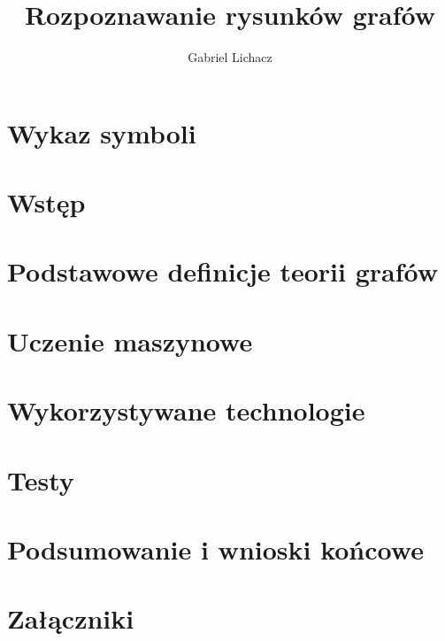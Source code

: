 \documentclass[12pt,twoside]{article}
\author{Gabriel Lichacz}
\title{Rozpoznawanie rysunków grafów}
\begin{document}
\maketitle

\blankpage

\tableofcontents

\clearpage
\blankpage

\section*{Wykaz symboli}

\clearpage

\section{Wstęp}


\section{Podstawowe definicje teorii grafów}


\section{Uczenie maszynowe}


\section{Wykorzystywane technologie}


\section{Testy}


\section{Podsumowanie i wnioski końcowe}


\clearpage

\section*{Załączniki}


\clearpage



\clearpage

\makesummary
\end{document}

